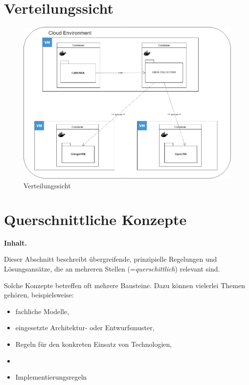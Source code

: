 \documentclass[]{article}
\begin{document}
\hypertarget{section-deployment-view}{%
\section{Verteilungssicht}\label{section-deployment-view}}
\begin{figure}[H]
	\centering
	\includegraphics[width=1.0\linewidth]{"images/verteilungssicht"}
	\caption{Verteilungssicht}
	\label{fig:verteilungssicht}
\end{figure}


\hypertarget{section-concepts}{%
\section{Querschnittliche Konzepte}\label{section-concepts}}

\textbf{Inhalt.}

Dieser Abschnitt beschreibt übergreifende, prinzipielle Regelungen und
Lösungsansätze, die an mehreren Stellen (=\emph{querschittlich})
relevant sind.

Solche Konzepte betreffen oft mehrere Bausteine. Dazu können vielerlei
Themen gehören, beispielsweise:

\begin{itemize}
\item
  fachliche Modelle,
\item
  eingesetzte Architektur- oder Entwurfsmuster,
\item
  Regeln für den konkreten Einsatz von Technologien,
\item
\item
  Implementierungsregeln
\end{itemize}
\end{document}
